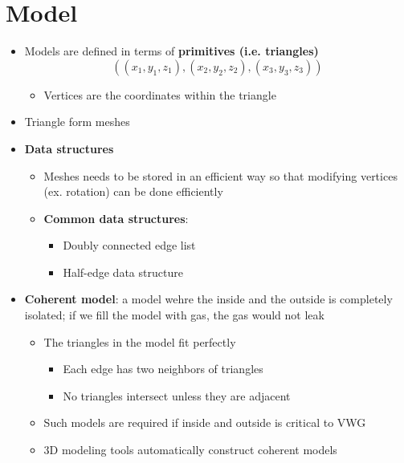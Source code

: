 \chapter{Model}

\begin{itemize}
  \item Models are defined in terms of \textbf{primitives (i.e. triangles)}
  \begin{equation}
    \left(
      \left( x_{1}, y_{1}, z_{1} \right),
      \left( x_{2}, y_{2}, z_{2} \right),
      \left( x_{3}, y_{3}, z_{3} \right)
    \right)
  \end{equation}

  \begin{itemize}
    \item Vertices are the coordinates within the triangle
  \end{itemize}

  \item Triangle form meshes
  \item \textbf{Data structures}
  \begin{itemize}
    \item Meshes needs to be stored in an efficient way so that modifying
    vertices (ex. rotation) can be done efficiently
    \item \textbf{Common data structures}:
    \begin{itemize}
      \item Doubly connected edge list
      \item Half-edge data structure
    \end{itemize}
  \end{itemize}

  \item \textbf{Coherent model}: a model wehre the inside and the outside is
  completely isolated; if we fill the model with gas, the gas would not leak
  \begin{itemize}
    \item The triangles in the model fit perfectly
    \begin{itemize}
      \item Each edge has two neighbors of triangles
      \item No triangles intersect unless they are adjacent
    \end{itemize}

    \item Such models are required if inside and outside is critical to VWG
    \item 3D modeling tools automatically construct coherent models
  \end{itemize}


\end{itemize}
